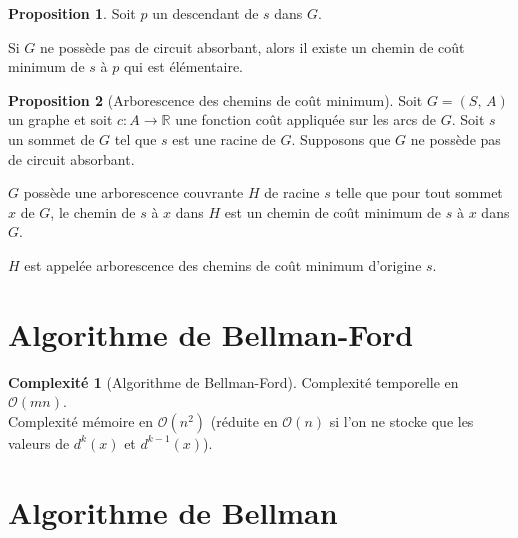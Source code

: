 \documentclass[11pt,english,french]{scrreprt}
\theoremstyle{remark}
\theoremstyle{definition}
\newtheorem*{prop*}{Proposition}
\newtheorem*{comp*}{Complexité}
\begin{document}
\begin{prop*}
	Soit $p$ un descendant de $s$ dans $G$.
	
	Si $G$ ne possède pas de circuit absorbant, alors il existe un chemin de coût minimum de $s$ à $p$ qui est élémentaire.
\end{prop*}

\begin{prop*}[Arborescence des chemins de coût minimum]
	Soit $G=(S,\,A)$ un graphe et soit $c\colon A\longrightarrow \mathbb{R}$ une fonction coût appliquée sur les arcs de $G$. Soit $s$ un sommet de $G$ tel que $s$ est une racine de $G$. Supposons que $G$ ne possède pas de circuit absorbant.
	
	$G$ possède une arborescence couvrante $H$ de racine $s$ telle que pour tout sommet $x$ de $G$, le chemin de $s$ à $x$ dans $H$ est un chemin de coût minimum de $s$ à $x$ dans $G$.
	
	$H$ est appelée arborescence des chemins de coût minimum d'origine $s$.
\end{prop*}

\section{Algorithme de Bellman-Ford} %

\begin{algorithm}[H]
	\DontPrintSemicolon
	\caption{Algorithme de Bellman-Ford}
\end{algorithm}

\begin{comp*}[Algorithme de Bellman-Ford]
	Complexité temporelle en $\mathcal{O}(mn)$.\\
	Complexité mémoire en $\mathcal{O}(n^2)$ (réduite en $\mathcal{O}(n)$ si l'on ne stocke que les valeurs de $d^k(x)$ et $d^{k-1}(x)$).
\end{comp*}

\section{Algorithme de Bellman} %
\end{document}
